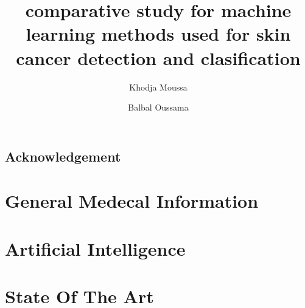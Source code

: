 \documentclass[12pt,a4paper]{report}
\title{comparative study for machine learning methods used for skin cancer detection and clasification}
\author{
	Khodja Moussa
	\and
	Balbal Oussama
}
\date{}
\begin{document}


\section*{Acknowledgement}
\newpage

\tableofcontents
\listoffigures
\listoftables
\newpage





\chapter{General Medecal Information}





\chapter{Artificial Intelligence}


\chapter{State Of The Art}





\end{document}
